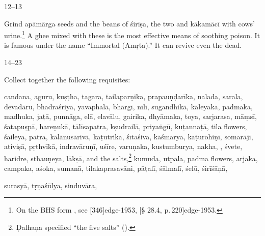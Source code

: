 \begin{translation}
    
\item [12--13]    

Grind \gls{apāmārga} seeds and the beans of \gls{śirīṣa}, the two 
 and \gls{kākamācī} with cows' urine.\footnote{On the BHS 
form , see [346]{edge-1953}, [\S 
28.4, p.\,220]{edge-1953}.}  A ghee mixed with 
these is the most effective means of soothing poison.  It is famous under the 
name “Immortal (Amṛta).”  It can revive even the dead.


\item [14--23] 

Collect together the following requisites:

\gls{candana}, \gls{aguru},  \gls{kuṣṭha},  \gls{tagara},
\gls{tailaparṇika}, \gls{prapauṇḍarīka}, \gls{nalada}, \gls{sarala},
\gls{devadāru}, \gls{bhadraśriya}, \gls{yavaphalā}, \gls{bhārgī},
\gls{nīlī}, \gls{sugandhikā}, \gls{kāleyaka}, \gls{padmaka},
\gls{madhuka},  \gls{jaṭā}, \gls{punnāga},
\gls{elā}, \gls{elavālu},  \gls{gairika},  \gls{dhyāmaka},
\gls{toya}, \gls{sarjarasa}, \gls{māṃsī}, \gls{śatapuṣpā},
\gls{hareṇukā}, \gls{tālīsapatra}, \gls{kṣudrailā}, \gls{priyaṅgū},
\gls{kuṭannaṭā}, \gls{tila} flowers, \gls{śaileya}, \gls{patra},
\gls{kālānusārivā}, \gls{kaṭutrika}, \gls{śītaśiva}, \gls{kāśmarya},
\gls{kaṭurohiṇī}, \gls{somarājī}, \gls{ativiṣā}, \gls{pṛthvīkā},
\gls{indravāruṇī}, \gls{uśīre}, \gls{varuṇaka}, \gls{kustumburya},
\gls{nakha}, , %
    \gls{śvete}, \gls{haridre}, \gls{sthauṇeya}, \gls{lākṣā}, and the
    salts,\footnote{Ḍalhaṇa specified “the five salts” 
    ().} %
    \gls{kumuda}, \gls{utpala}, \gls{padma} flowers, %
    \gls{arjaka}, \gls{campaka}, \gls{aśoka}, %
    \gls{sumanā}, \gls{tilakaprasavāni}, \gls{pāṭalī}, \gls{śālmalī},
    \gls{śelū}, \gls{śirīśāṇā},


\gls{surasyā},  
\gls{tṛṇaśūlya},  
\gls{sinduvāra}, 



\end{translation}
